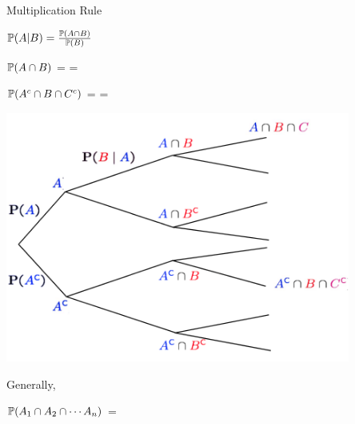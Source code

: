 \documentclass[handout,fleqn,aspectratio=169]{beamer}
\begin{document}
\begin{frame}{Multiplication Rule}

{
\plitemsep 0.1in
\bci 

\item<1-> $\mathbb{P}( A | B ) = \frac{\mathbb{P}( A \cap B )}{\mathbb{P}( B )}$

\item $\mathbb{P}( A \cap B )$ =  = 

\item $\mathbb{P}( A^c \cap B \cap C^c )$ = 
 = 
\bigskip

\eci 
}
{
\centering
\includegraphics[width=0.85\textwidth]{L2_multi_ex.png}
}

Generally, 

$\mathbb{P}( A_1 \cap A_2 \cap \cdots A_n )$ = 

\end{frame}
\end{document}
